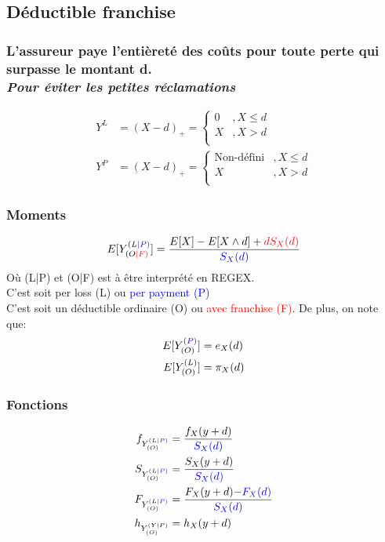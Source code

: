\documentclass[french, landscape]{article}
\begin{document}
\begin{multicols*}{3}
\subsection*{Déductible franchise}
\subsubsection*{L'assureur paye l'entièreté des coûts pour toute perte qui surpasse le montant d.\\ \textit{Pour éviter les petites réclamations}}
\begin{align*}
Y^L &= (X-d)_+ = 
	\begin{cases}
		0		& , X \leq d \\
		X		& , X > d \\
	\end{cases} \\
Y^P &= (X-d)_+ = 
	\begin{cases}
		\text{Non-défini}	& , X \leq d \\
		X 					& , X > d \\
	\end{cases}
\end{align*}

\subsubsection*{Moments}
\begin{align*}
E[Y_{(O\textcolor{red}{|F)}}^{(L\textcolor{blue}{|P)}}] &= \frac{E[X] - E[X \wedge d] + \textcolor{red}{d S_X(d)} }{\textcolor{blue}{S_X(d)}} \\
\end{align*}
Où (L|P) et (O|F) est à être interprété en REGEX. \\
C'est soit per loss (L) ou \textcolor{blue}{per payment (P)} \\
C'est soit un déductible ordinaire (O) ou \textcolor{red}{avec franchise (F)}.
De plus, on note que:
\begin{align*}
E[Y_{(O)}^{(\textcolor{blue}{P)}}] &= e_X(d) \\
E[Y_{(O)}^{(L)}] &= \pi_X(d)
\end{align*}

\subsubsection*{Fonctions}
\begin{align*}
f_{Y^{(L\textcolor{blue}{|P)}}_{(O)}} &= \frac{f_X(y+d)}{\textcolor{blue}{S_X(d)}} \\
S_{Y^{(L\textcolor{blue}{|P)}}_{(O)}} &= \frac{S_X(y+d)}{\textcolor{blue}{S_X(d)}} \\
F_{Y^{(L\textcolor{blue}{|P)}}_{(O)}} &= \frac{F_X(y+d) \textcolor{blue}{- F_X(d)}}{\textcolor{blue}{S_X(d)}} \\
h_{Y^{(Y|P)}_{(O)}} &= h_X(y+d) \\
\end{align*}



\end{multicols*}
\end{document}
